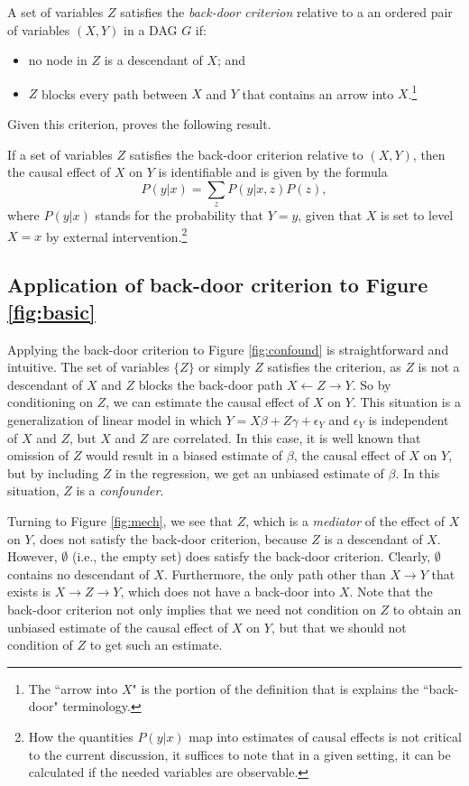 \documentclass[12pt,reqno,titlepage]{amsart}
\begin{document}
\begin{definition}
A set of variables $Z$ satisfies the \emph{back-door criterion} relative to a an ordered pair of variables $(X, Y)$ in a 
	DAG $G$ if:
	\begin{itemize}
		\item no node in $Z$ is a descendant of $X$; and
		\item $Z$ blocks every path between $X$ and $Y$ that contains an arrow into $X$.\footnote{The ``arrow into $X$" is the portion of the definition that is explains the ``back-door" terminology.}
	\end{itemize}
\end{definition}%
Given this criterion, \citet[p.\,79]{Pearl:2009vo} proves the following result.
%
\begin{theorem}
	If a set of variables $Z$ satisfies the back-door criterion relative to $(X, Y)$, then the causal effect of $X$ on $Y$ is identifiable and is given by the formula 
	\[ P(y | x) = \sum_{z} P(y | x, z) P(z), \]
where $P(y|x)$ stands for the probability that $Y = y$, given that $X$ is set to level $X=x$ by external intervention.\footnote{
How the quantities $P(y|x)$ map into estimates of causal effects is not critical to the current discussion, it suffices to note that in a given setting, it can be calculated if the needed variables are observable.}
\end{theorem}
%

 \subsection{Application of back-door criterion to Figure \ref{fig:basic}}
Applying the back-door criterion to Figure \ref{fig:confound} is straightforward and intuitive.
The set of variables $\{Z\}$ or simply $Z$ satisfies the criterion, as $Z$ is not a descendant of $X$ and $Z$ blocks the back-door path $X \leftarrow Z \rightarrow Y$.
So by conditioning on $Z$, we can estimate the causal effect of $X$ on $Y$.
This situation is a generalization of linear model in which $Y = X \beta + Z \gamma + \epsilon_Y$ and $\epsilon_Y$ is independent of $X$ and $Z$, but $X$ and $Z$ are correlated.
In this case, it is well known that omission of $Z$ would result in a biased estimate of $\beta$, the causal effect of $X$ on $Y$, but by including $Z$ in the regression, we get an unbiased estimate of $\beta$.
In this situation, $Z$ is a \emph{confounder}.

Turning to Figure \ref{fig:mech}, we see that $Z$, which is a \emph{mediator} of the effect of $X$ on $Y$, does not satisfy the back-door criterion, because $Z$ is a descendant of $X$.
However, $\emptyset$ (i.e., the empty set) does satisfy the back-door criterion.
Clearly, $\emptyset$ contains no descendant of $X$.
Furthermore, the only path other than $X \rightarrow Y$ that exists is $X \rightarrow Z \rightarrow Y$, which does not have a back-door into $X$.
Note that the back-door criterion not only implies that we need not condition on $Z$ to obtain an unbiased estimate of the causal effect of $X$ on $Y$, but that we should not condition of $Z$ to get such an estimate.
\end{document}
